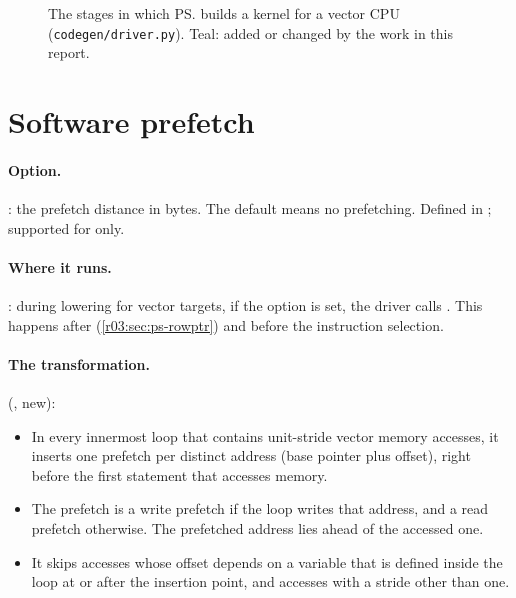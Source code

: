 \begin{figure}[htbp]
  \centering
  \resizebox{\linewidth}{!}{}
  \caption[The stages of pystencils and the additions]{The stages in which \ps{} builds a
    kernel for a vector CPU (\texttt{codegen/driver.py}). Teal: added or changed by the work in
    this report.}\label{r03:fig:pipeline}
\end{figure}

\section{Software prefetch}\label{r03:sec:ps-prefetch}

\paragraph{Option.} : the prefetch distance in bytes.
The default  means no prefetching. Defined in
; supported for  only.

\paragraph{Where it runs.} : during lowering for vector
targets, if the option is set, the driver calls
. This happens after
 (\cref{r03:sec:ps-rowptr}) and before the instruction selection.

\paragraph{The transformation.} 
(, new):
\begin{itemize}
  \item In every innermost loop that contains unit-stride vector memory accesses, it inserts
        one prefetch per distinct address (base pointer plus offset), right before the first
        statement that accesses memory.
  \item The prefetch is a write prefetch if the loop writes that address, and a read prefetch
        otherwise. The prefetched address lies  ahead of the accessed
        one.
  \item It skips accesses whose offset depends on a variable that is defined inside the loop
        at or after the insertion point, and accesses with a stride other than one.
\end{itemize}

